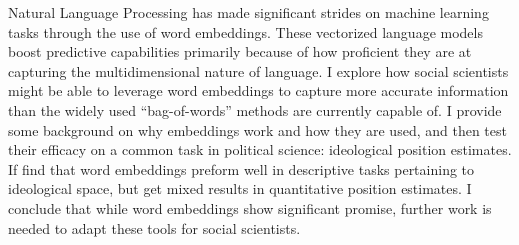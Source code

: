 \documentclass[../embeddings.tex]{subfiles}
\begin{document}
Natural Language Processing has made significant strides on machine learning tasks through the use of word embeddings. These vectorized language models boost predictive capabilities primarily because of how proficient they are at capturing the multidimensional nature of language. I explore how social scientists might be able to leverage word embeddings to capture more accurate information than the widely used “bag-of-words” methods are currently capable of. I provide some background on why embeddings work and how they are used, and then test their efficacy on a common task in political science: ideological position estimates. If find that word embeddings preform well in descriptive tasks pertaining to ideological space, but get mixed results in quantitative position estimates. I conclude that while word embeddings show significant promise,  further work is needed to adapt these tools for social scientists.
\end{document}
